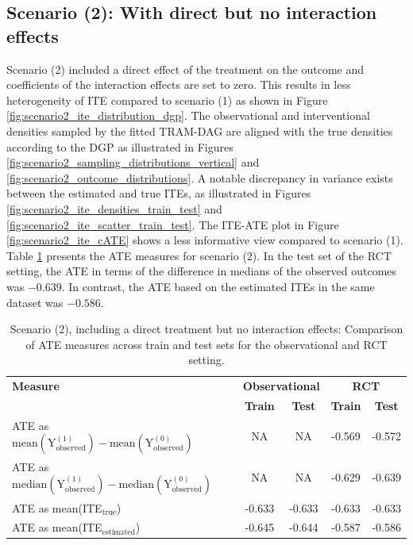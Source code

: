 \clearpage


\subsection{Scenario (2): With direct but no interaction effects}

Scenario (2) included a direct effect of the treatment on the outcome and coefficients of the interaction effects are set to zero. This results in less heterogeneity of ITE compared to scenario (1) as shown in Figure \ref{fig:scenario2_ite_distribution_dgp}. The observational and interventional densities sampled by the fitted TRAM-DAG are aligned with the true densities according to the DGP as illustrated in Figures \ref{fig:scenario2_sampling_distributions_vertical} and \ref{fig:scenario2_outcome_distributions}. A notable discrepancy in variance exists between the estimated and true ITEs, as illustrated in Figures \ref{fig:scenario2_ite_densities_train_test} and \ref{fig:scenario2_ite_scatter_train_test}. The ITE-ATE plot in Figure \ref{fig:scenario2_ite_cATE} shows a less informative view compared to scenario (1). Table \ref{tab:scenario2_ate_comparison} presents the ATE measures for scenario (2). In the test set of the RCT setting, the ATE in terms of the difference in medians of the observed outcomes was $-0.639$. In contrast, the ATE based on the estimated ITEs in the same dataset was $-0.586$.


\begin{table}[htbp]
\centering
\small
\caption{Scenario (2), including a direct treatment but no interaction effects: Comparison of ATE measures across train and test sets for the observational and RCT setting.}
\label{tab:scenario2_ate_comparison}
\begin{tabular}{l c c c c}
\toprule
\textbf{Measure} & \multicolumn{2}{c}{\textbf{Observational}} & \multicolumn{2}{c}{\textbf{RCT}} \\
\cmidrule(lr){2-3} \cmidrule(lr){4-5}
 & \textbf{Train} & \textbf{Test} & \textbf{Train} & \textbf{Test} \\
\midrule
ATE as $\text{mean}(\text{Y}_\text{observed}^{(1)}) - \text{mean}(\text{Y}_\text{observed}^{(0)})$ & NA & NA & -0.569 & -0.572 \\
ATE as $\text{median}(\text{Y}_\text{observed}^{(1)}) - \text{median}(\text{Y}_\text{observed}^{(0)})$  & NA & NA & -0.629 & -0.639 \\
ATE as mean(ITE$_\text{true}$)  & -0.633 & -0.633 & -0.633 & -0.633 \\
ATE as mean(ITE$_\text{estimated}$) & -0.645 & -0.644 & -0.587 & -0.586 \\
\bottomrule
\end{tabular}
\end{table}



